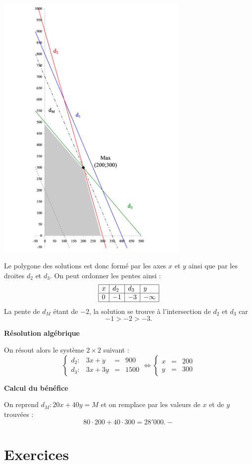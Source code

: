 \begin{exemple}
\begin{center}
\includegraphics[width = 0.7\textwidth]{programmation/exercice.png}
\end{center}

Le polygone des solutions est donc formé par les axes $x$ et $y$ ainsi que par les droites $d_2$ et $d_3$. On peut ordonner les pentes ainsi :
$$
\begin{array}{|l|l|l|l|}
\hline
x & d_2 & d_3 & y\\
\hline
0 & -1 & -3 & -\infty \\
\hline
\end{array}
$$
La pente de $d_M$ étant de $-2$, la solution se trouve à l'intersection de $d_2$ et $d_3$ car
$$
-1 > -2 > -3.
$$

\textbf{Résolution algébrique}

On résout alors le système $2\times 2$ suivant :
$$
\left\{
\begin{array}{llcl}
d_2 : & 3x+y &=& 900 \\
d_3 : & 3x + 3y &=& 1500
\end{array}
\right.
\Leftrightarrow
\left\{
\begin{array}{lcl}
x &=& 200\\
y &=& 300
\end{array}
\right.
$$

\textbf{Calcul du bénéfice}

On reprend $d_M : 20x + 40y = M$ et on remplace par les valeurs de $x$ et de $y$ trouvées :
$$
80 \cdot 200 + 40  \cdot 300 = 28'000.-
$$

\end{exemple}


\section{Exercices}

